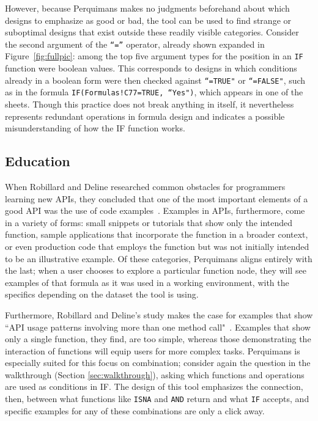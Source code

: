 \documentclass[conference]{IEEEtran}
\newcommand{\toolname}{Perquimans\xspace} \newcommand{\toolnameend}{Perquimans}
\begin{document}
	However, because \toolname makes no judgments beforehand about which designs to
	emphasize as good or bad, the tool can be used to find strange or suboptimal
	designs that exist outside these readily visible categories. Consider the
	second argument of the \texttt{``=''} operator, already shown expanded in
	Figure~\ref{fig:fullpic}: among the top five argument types for the position in
	an \texttt{IF} function were boolean values. This corresponds to designs in which
	conditions already in a boolean form were then checked against \texttt{``=TRUE"} or
	\texttt{``=FALSE"}, such as in the formula \texttt{IF(Formulas!C77=TRUE, ``Yes")}, which
	appears in one of the sheets. Though this practice does not break anything in
	itself, it nevertheless represents redundant operations in formula design and
	indicates a possible misunderstanding of how the IF function works.
	
	\subsection{Education} When Robillard and Deline researched common obstacles
	for programmers learning new APIs, they concluded that one of the most
	important elements of a good API was the use of code examples~\cite{robillard2011field}. Examples in APIs, furthermore, come in
	a variety of forms: small snippets or tutorials that show only the intended
	function, sample applications that incorporate the function in a broader
	context, or even production code that employs the function but was not
	initially intended to be an illustrative example. Of these categories,
	\toolname aligns entirely with the last; when a user chooses to explore a
	particular function node, they will see examples of that formula as it was used
	in a working environment, with the specifics depending on the dataset the tool
	is using. 

	Furthermore, Robillard and Deline's study makes the case for examples that show
	``API usage patterns involving more than one method
	call"~\cite{robillard2011field}. Examples that show only a single function,
	they find, are too simple, whereas those demonstrating the interaction of
	functions will equip users for more complex tasks. \toolname is especially
	suited for this focus on combination; consider again the question in the
	walkthrough (Section \ref{sec:walkthrough}), asking which functions and
	operations are used as conditions in IF. The design of this tool emphasizes the
	connection, then, between what functions like \texttt{ISNA} and \texttt{AND}
	return and what \texttt{IF} accepts, and specific examples for any of these
	combinations are only a click away.
	
\end{document}
